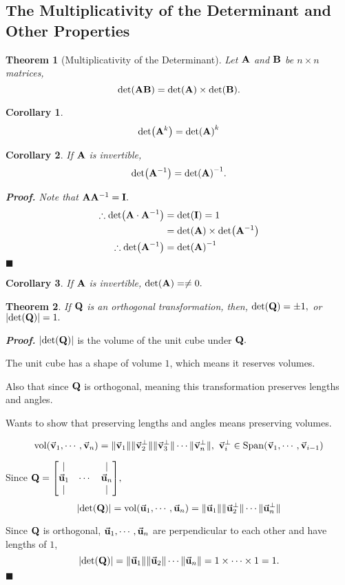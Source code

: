 \documentclass[12pt, a4paper]{article}
\newtheorem{thm}{Theorem}[subsection]
\newtheorem{cor}{Corollary}[section]
\newenvironment*{prf}{\par\indent\textbf{\textit{Proof. }}}{\hfill $\blacksquare$\par}
\def\Span{\mathrm{Span}}
\def\vol{\mathrm{vol}}
\def\vecv{\va{v}}
\def\vecu{\va{u}}
\def\matrixA{\vb{A}}
\def\matrixB{\vb{B}}
\def\matrixI{\vb{I}}
\begin{document}
\subsection{The Multiplicativity of the Determinant and Other Properties}
\begin{thm}[Multiplicativity of the Determinant]
	Let $\matrixA$ and $\matrixB$ be $n\times n$ matrices, \[\det(\matrixA\matrixB)=\det(\matrixA)\times\det(\matrixB).\]	
\end{thm}
\begin{cor}
	\[\det(\matrixA^k)=\det(\matrixA)^k\]
\end{cor}
\begin{cor}
	If $\matrixA$ is invertible, \[\det(\matrixA^{-1})=\det(\matrixA)^{-1}.\]
	\begin{prf}
		Note that $\matrixA\matrixA^{-1}=\matrixI.$\[\begin{aligned}\therefore\det(\matrixA\cdot\matrixA^{-1})&=\det(\matrixI)=1\\&=\det(\matrixA)\times\det(\matrixA^{-1})\\\therefore\det(\matrixA^{-1})&=\det(\matrixA)^{-1}\end{aligned}\]
	\end{prf}
\end{cor}
\begin{cor}
	If $\matrixA$ is invertible, $\det(\matrixA)=\neq0.$	
\end{cor}
\begin{thm}
	If $\vb Q$ is an orthogonal transformation, then, $\det(\vb Q)=\pm1,$ or $\qty|\det(\vb Q)|=1.$	
\end{thm}
\begin{prf}
	$\qty|\det(\vb Q)|$ is the volume of the unit cube under $\vb Q.$\par The unit cube has a shape of volume $1$, which means it reserves volumes.\par Also that since $\vb Q$ is orthogonal, meaning this transformation preserves lengths and angles.\par Wants to show that preserving lengths and angles means preserving volumes.\par \[\vol(\vecv_1,\cdots,\vecv_n)=\|\vecv_1\|\|\vecv_2^\perp\|\|\vecv_3^\perp\|\cdots\|\vecv_n^\perp\|,\ \vecv_i^\perp\in\Span(\vecv_1,\cdots,\vecv_{i-1})\]\par Since $\vb Q=\mqty[{|&&|\\\vecu_1&\cdots&\vecu_n\\|&&|}],$ \[\qty|\det(\vb Q)|=\vol(\vecu_1,\cdots,\vecu_n)=\|\vecu_1\|\|\vecu_2^\perp\|\cdots\|\vecu_n^\perp\|\]\par Since $\vb Q$ is orthogonal, $\vecu_1,\cdots,\vecu_n$ are perpendicular to each other and have lengths of $1$, \[\qty|\det(\vb Q)|=\|\vecu_1\|\|\vecu_2\|\cdots\|\vecu_n\|=1\time1\times\cdots\times1=1.\]
\end{prf}
\end{document}
